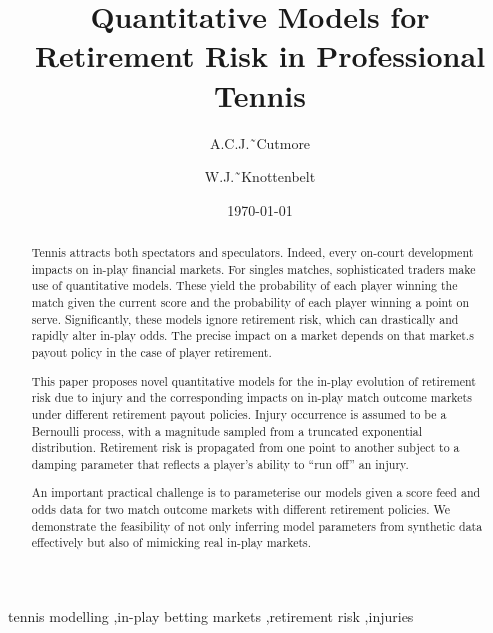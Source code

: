 \documentclass[authoryear, 12pt]{elsarticle}
\begin{document}
\title{Quantitative Models for Retirement Risk in Professional Tennis}

\author[icl]{A.C.J.˜Cutmore}

\author[icl]{W.J.˜Knottenbelt}



\address[icl]{Imperial College London, South Kensington Campus, Exhibition Road,
London, SW7 2AZ, UK}

\date{\today}

\begin{abstract}

Tennis attracts both spectators and speculators.  Indeed, every
on-court development impacts on in-play financial markets.  For
singles matches, sophisticated traders make use of quantitative
models.  These yield the probability of each player winning the match
given the current score and the probability of each player winning a
point on serve.  Significantly, these models ignore retirement risk,
which can drastically and rapidly alter in-play odds. The precise
impact on a market depends on that market.s payout policy in the case
of player retirement.

This paper proposes novel quantitative models for the in-play
evolution of retirement risk due to injury and the corresponding
impacts on in-play match outcome markets under different retirement
payout policies. Injury occurrence is assumed to be a Bernoulli
process, with a magnitude sampled from a truncated exponential
distribution. Retirement risk is propagated from one point to another
subject to a damping parameter that reflects a player's ability to
``run off'' an injury.

An important practical challenge is to parameterise our models given a
score feed and odds data for two match outcome markets with different
retirement policies. We demonstrate the feasibility of not only
inferring model parameters from synthetic data effectively but also of
mimicking real in-play markets.

\end{abstract}

\begin{keyword}
tennis modelling \sep in-play betting markets \sep retirement risk \sep injuries
\end{keyword}
\end{document}
